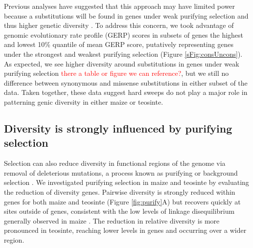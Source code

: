 \documentclass{pnastwo}
\newcommand{\jri}[1]{\textcolor{red}{\scriptsize #1}}
\begin{document}
\begin{article}
Previous analyses have suggested that this approach may have limited power because a \DIFdelbegin {}\DIFdelend \DIFaddbegin {}\DIFaddend substitutions will be found in genes under weak purifying selection and thus \DIFdelbegin {}\DIFdelend higher genetic diversity \cite{enard2014}. 
To address this concern, we took advantage of \DIFaddbegin {}\DIFaddend genomic evolutionary rate profile (GERP) scores \cite{davydov2010}\DIFdelbegin {}\DIFdelend \DIFaddbegin {}\DIFaddend in subsets of genes \DIFdelbegin {}\DIFdelend \DIFaddbegin {}\DIFaddend the highest and lowest 10\% quantile of mean GERP score, putatively representing genes under the strongest and weakest purifying selection  (Figure \ref{sFig:consUncons}). 
As expected, we see higher diversity around substitutions in genes under weak purifying selection \DIFaddbegin \jri{there a table or figure we can reference?}\DIFaddend , but we still \DIFdelbegin {}\DIFdelend \DIFaddbegin {}\DIFaddend no difference between synonymous and missense substitutions in either subset of the data.
Taken together, these data suggest hard sweeps do not play a major role in patterning genic diversity in either maize or teosinte.

\subsection{Diversity is strongly influenced by purifying selection} 
Selection can also reduce diversity in functional regions of the genome via removal of deleterious mutations, a process known \DIFdelbegin {}\DIFdelend as purifying or background selection \cite{charlesworth1993}.
We investigated purifying selection in maize and teosinte by evaluating the reduction of diversity \DIFdelbegin {}\DIFdelend \DIFaddbegin {}\DIFaddend genes.
Pairwise diversity is strongly reduced within genes for both maize and teosinte (Figure \ref{fig:purify}A) but recovers quickly at sites outside of genes, consistent with the low levels of linkage disequilibrium generally observed in maize \cite{tenaillon2002,chia2012}. 
The reduction in relative diversity is more pronounced in teosinte, \DIFdelbegin {}\DIFdelend reaching lower levels in genes and occurring over a wider region.  


\end{article}
\end{document}
